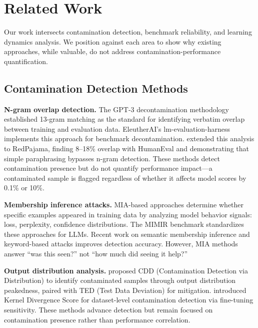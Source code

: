 \section{Related Work}

Our work intersects contamination detection, benchmark reliability, and learning dynamics analysis. We position against each area to show why existing approaches, while valuable, do not address contamination-performance quantification.

\subsection{Contamination Detection Methods}

\textbf{N-gram overlap detection.} The GPT-3 decontamination methodology \citep{brown2020language} established 13-gram matching as the standard for identifying verbatim overlap between training and evaluation data. EleutherAI's lm-evaluation-harness implements this approach for benchmark decontamination. \citet{yang2023rethinking} extended this analysis to RedPajama, finding 8--18\% overlap with HumanEval and demonstrating that simple paraphrasing bypasses n-gram detection. These methods detect contamination presence but do not quantify performance impact---a contaminated sample is flagged regardless of whether it affects model scores by 0.1\% or 10\%.

\textbf{Membership inference attacks.} MIA-based approaches \citep{carlini2021extracting,shi2024detecting} determine whether specific examples appeared in training data by analyzing model behavior signals: loss, perplexity, confidence distributions. The MIMIR benchmark \citep{duan2024mimir} standardizes these approaches for LLMs. Recent work on semantic membership inference \citep{mozaffari2024semantic} and keyword-based attacks \citep{antebi2025tagtab} improves detection accuracy. However, MIA methods answer ``was this seen?'' not ``how much did seeing it help?''

\textbf{Output distribution analysis.} \citet{dong2024generalization} proposed CDD (Contamination Detection via Distribution) to identify contaminated samples through output distribution peakedness, paired with TED (Test Data Deviation) for mitigation. \citet{choi2025contaminated} introduced Kernel Divergence Score for dataset-level contamination detection via fine-tuning sensitivity. These methods advance detection but remain focused on contamination presence rather than performance correlation.

